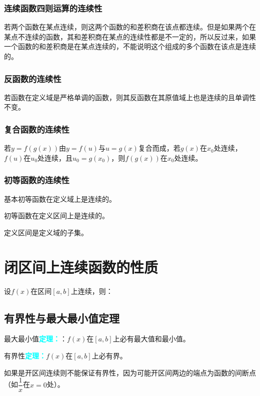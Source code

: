 \documentclass[UTF8, 12pt]{ctexart}
\begin{document}
\subsubsection{连续函数四则运算的连续性}

若两个函数在某点连续，则这两个函数的和差积商在该点都连续。但是如果两个在某点不连续的函数，其和差积商在某点的连续性都是不一定的，所以反过来，如果一个函数的和差积商是在某点连续的，不能说明这个组成的多个函数在该点是连续的。

\subsubsection{反函数的连续性}

若函数在定义域是严格单调的函数，则其反函数在其原值域上也是连续的且单调性不变。

\subsubsection{复合函数的连续性}

若$y=f(g(x))$由$y=f(u)$与$u=g(x)$复合而成，若$g(x)$在$x_0$处连续，$f(u)$在$u_0$处连续，且$u_0=g(x_0)$，则$f(g(x))$在$x_0$处连续。

\subsubsection{初等函数的连续性}

基本初等函数在定义域上是连续的。

初等函数在定义区间上是连续的。

定义区间是定义域的子集。

\section{闭区间上连续函数的性质}

设$f(x)$在区间$[a,b]$上连续，则：

\subsection{有界性与最大最小值定理}

最大最小值\textcolor{aqua}{\textbf{定理：}}：$f(x)$在$[a,b]$上必有最大值和最小值。

有界性\textcolor{aqua}{\textbf{定理：}}$f(x)$在$[a,b]$上必有界。

如果是开区间连续则不能保证有界性，因为可能开区间两边的端点为函数的间断点（如$\dfrac{1}{x}$在$x=0$处）。
\end{document}
